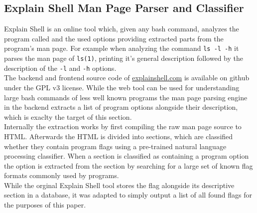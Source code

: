 \documentclass[9pt, a4paper, twocolumn]{article}
\begin{document}
\subsection{Explain Shell Man Page Parser and Classifier} \label{sec:findflags:nlp}
Explain Shell\cite{explainshell} is an online tool which, given any bash command, analyzes the program called and the used options providing extracted parts from the program's man page. For example when analyzing the command \verb'ls -l -h' it parses the man page of \verb'ls(1)', printing it's general description followed by the description of the \verb'-l' and \verb'-h' options. \\
The backend and frontend source code of \url{explainshell.com} is available on github under the GPL v3 license\cite{explainshellsrc}. While the web tool can be used for understanding large bash commands of less well known programs the man page parsing engine in the backend extracts a list of program options alongside their description, which is exaclty the target of this section. \\
Internally the extraction works by first compiling the raw man page source to HTML. Afterwards the HTML is divided into sections, which are classified whether they contain program flags using a pre-trained natural language processing classifier. When a section is classified as containing a program option the option is extracted from the section by searching for a large set of known flag formats commonly used by programs\cite{explainshellsrc}. \\
While the orginal Explain Shell tool stores the flag alongside its descriptive section in a database, it was adapted to simply output a list of all found flags for the purposes of this paper\cite{compiler-flag-ranking}.
\end{document}
